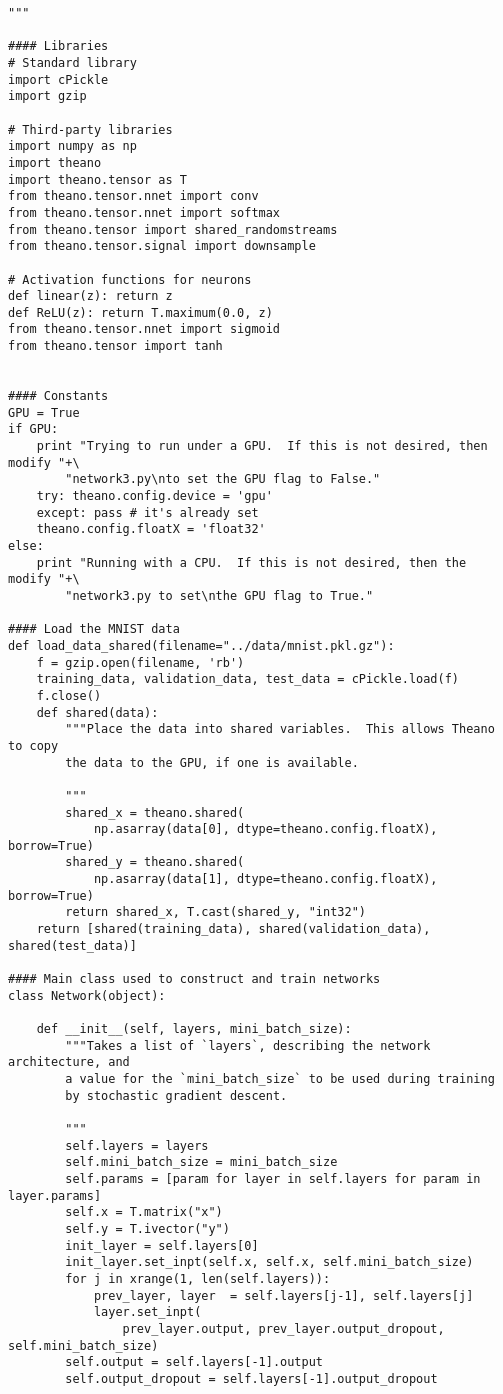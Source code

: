 \begin{lstlisting}
"""

#### Libraries
# Standard library
import cPickle
import gzip

# Third-party libraries
import numpy as np
import theano
import theano.tensor as T
from theano.tensor.nnet import conv
from theano.tensor.nnet import softmax
from theano.tensor import shared_randomstreams
from theano.tensor.signal import downsample

# Activation functions for neurons
def linear(z): return z
def ReLU(z): return T.maximum(0.0, z)
from theano.tensor.nnet import sigmoid
from theano.tensor import tanh


#### Constants
GPU = True
if GPU:
    print "Trying to run under a GPU.  If this is not desired, then modify "+\
        "network3.py\nto set the GPU flag to False."
    try: theano.config.device = 'gpu'
    except: pass # it's already set
    theano.config.floatX = 'float32'
else:
    print "Running with a CPU.  If this is not desired, then the modify "+\
        "network3.py to set\nthe GPU flag to True."

#### Load the MNIST data
def load_data_shared(filename="../data/mnist.pkl.gz"):
    f = gzip.open(filename, 'rb')
    training_data, validation_data, test_data = cPickle.load(f)
    f.close()
    def shared(data):
        """Place the data into shared variables.  This allows Theano to copy
        the data to the GPU, if one is available.

        """
        shared_x = theano.shared(
            np.asarray(data[0], dtype=theano.config.floatX), borrow=True)
        shared_y = theano.shared(
            np.asarray(data[1], dtype=theano.config.floatX), borrow=True)
        return shared_x, T.cast(shared_y, "int32")
    return [shared(training_data), shared(validation_data), shared(test_data)]

#### Main class used to construct and train networks
class Network(object):

    def __init__(self, layers, mini_batch_size):
        """Takes a list of `layers`, describing the network architecture, and
        a value for the `mini_batch_size` to be used during training
        by stochastic gradient descent.

        """
        self.layers = layers
        self.mini_batch_size = mini_batch_size
        self.params = [param for layer in self.layers for param in layer.params]
        self.x = T.matrix("x")
        self.y = T.ivector("y")
        init_layer = self.layers[0]
        init_layer.set_inpt(self.x, self.x, self.mini_batch_size)
        for j in xrange(1, len(self.layers)):
            prev_layer, layer  = self.layers[j-1], self.layers[j]
            layer.set_inpt(
                prev_layer.output, prev_layer.output_dropout, self.mini_batch_size)
        self.output = self.layers[-1].output
        self.output_dropout = self.layers[-1].output_dropout


\end{lstlisting}
